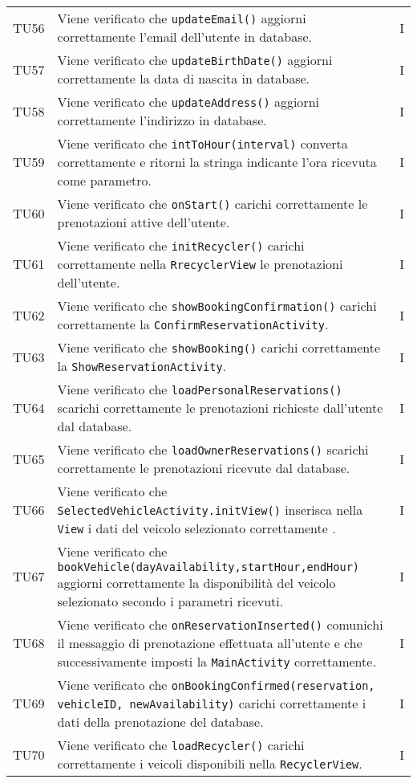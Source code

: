\begin{longtable}{ >{\centering}p{}  >{\centering}p{} >{\centering}p{}
			}
		\tabularnewline	
		TU56 & Viene verificato che \texttt{updateEmail()} aggiorni correttamente l'email dell'utente in database. & I 
		\tabularnewline	
		TU57 & Viene verificato che \texttt{updateBirthDate()} aggiorni correttamente la data di nascita in database. & I 
		\tabularnewline	
		TU58 & Viene verificato che \texttt{updateAddress()} aggiorni correttamente l'indirizzo in database. & I 
		\tabularnewline	
		TU59 & Viene verificato che \texttt{intToHour(interval)} converta correttamente e ritorni la stringa indicante l'ora ricevuta come parametro. & I 
		\tabularnewline	
		TU60 & Viene verificato che \texttt{onStart()} carichi correttamente le prenotazioni attive dell'utente. & I
		\tabularnewline	
		TU61 & Viene verificato che \texttt{initRecycler()} carichi correttamente nella \texttt{RrecyclerView} le prenotazioni dell'utente. & I 
		\tabularnewline	
		TU62 & Viene verificato che \texttt{showBookingConfirmation()} carichi correttamente la \texttt{ConfirmReservationActivity}. & I 
		\tabularnewline	
		TU63 & Viene verificato che \texttt{showBooking()} carichi correttamente la \texttt{ShowReservationActivity}. & I 
		\tabularnewline	
		TU64 & Viene verificato che \texttt{loadPersonalReservations()} scarichi correttamente le prenotazioni richieste dall'utente dal database. & I  
		\tabularnewline	
		TU65 & Viene verificato che \texttt{loadOwnerReservations()} scarichi correttamente le prenotazioni ricevute dal database. & I 
		\tabularnewline	
		TU66 & Viene verificato che \texttt{SelectedVehicleActivity.initView()} inserisca nella \texttt{View} i dati del veicolo selezionato correttamente . & I
		\tabularnewline	
		TU67 & Viene verificato che \texttt{bookVehicle(dayAvailability,startHour,endHour)} aggiorni correttamente la disponibilità del veicolo selezionato secondo i parametri ricevuti. & I 
		\tabularnewline	
		TU68 & Viene verificato che \texttt{onReservationInserted()} comunichi il messaggio di prenotazione effettuata all'utente e che successivamente imposti la \texttt{MainActivity} correttamente. & I 
		\tabularnewline	
		TU69 & Viene verificato che \texttt{onBookingConfirmed(reservation, vehicleID, newAvailability)} carichi correttamente i dati della prenotazione del database. & I
		\tabularnewline	
		TU70 & Viene verificato che \texttt{loadRecycler()} carichi correttamente i veicoli disponibili nella \texttt{RecyclerView}. & I \tabularnewline	
		

\end{longtable}
